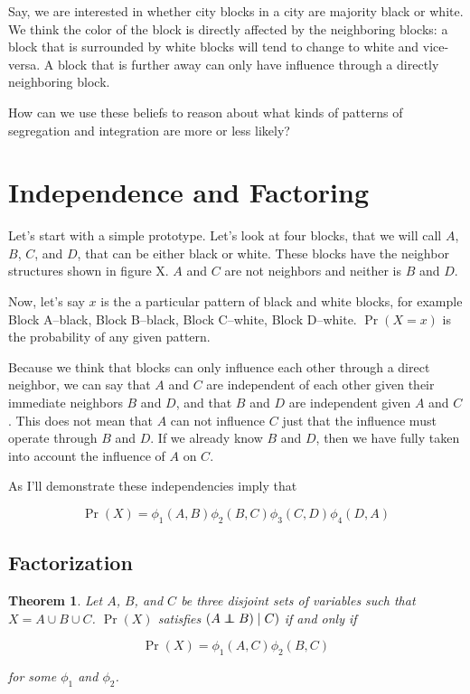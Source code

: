 \documentclass{article}
\newcommand\independent{\protect\mathpalette{\protect\independenT}{\perp}}
\def\independenT#1#2{\mathrel{\rlap{$#1#2$}\mkern2mu{#1#2}}}
\newtheorem{factors}{Theorem}
\begin{document}
Say, we are interested in whether city blocks in a city are majority
black or white. We think the color of the block is directly affected
by the neighboring blocks: a block that is surrounded by white blocks
will tend to change to white and vice-versa. A block that is further
away can only have influence through a directly neighboring block.

How can we use these beliefs to reason about what kinds of patterns of
segregation and integration are more or less likely? 

\section*{Independence and Factoring}
Let's start with a simple prototype. Let's look at four blocks, that
we will call $A$, $B$, $C$, and $D$, that can be either black or
white. These blocks have the neighbor structures shown in figure
X. $A$ and $C$ are not neighbors and neither is $B$ and $D$.

Now, let's say $x$ is the a particular pattern of black and white
blocks, for example Block A--black, Block B--black, Block C--white,
Block D--white. $\Pr(X=x)$ is the probability of any given pattern.

Because we think that blocks can only influence each other through a
direct neighbor, we can say that $A$ and $C$ are independent of each
other given their immediate neighbors $B$ and $D$, and that $B$ and
$D$ are independent given $A$ and $C$. This does not mean that $A$ can
not influence $C$ just that the influence must operate through $B$ and
$D$. If we already know $B$ and $D$, then we have fully taken into
account the influence of $A$ on $C$.

As I'll demonstrate these independencies imply that

\begin{equation}
\Pr(X) = \phi_1(A,B)\phi_2(B,C)\phi_3(C,D)\phi_4(D,A) 
\end{equation}

\subsection*{Factorization}

\begin{factors}
Let $A$, $B$, and $C$ be three disjoint sets of variables such that
$X = A \cup B \cup C$. $\Pr(X)$ satisfies $(A\independent B) \mid C)$
if and only if


\begin{equation}
\Pr(X) = \phi_1(A,C)\phi_2(B,C)
\end{equation}

for some $\phi_1$ and $\phi_2$.
\end{factors}
\end{document}
